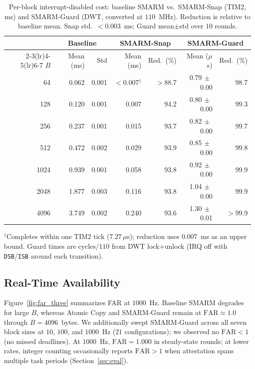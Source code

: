 \documentclass[conference]{IEEEtran}
\newcommand{\smarmcopy}{SMARM-Snap\xspace}
\newcommand{\smarmlock}{SMARM-Guard\xspace}
\begin{document}
\begin{table}[!t]
  \centering
  \small
  \caption{Per-block interrupt-disabled cost: baseline SMARM vs.\
    \smarmcopy{} (TIM2, ms) and \smarmlock{} (DWT, converted at
    $110$~MHz). Reduction is relative to baseline mean.
    Snap std.\ $<0.003$~ms; Guard mean$\pm$std over $10$ rounds.}
  \label{tab:tdisabled}
  \setlength{\tabcolsep}{2.8pt}
  \begin{tabular}{@{}rrrrrrr@{}}
    \toprule
    & \multicolumn{2}{c}{\textbf{Baseline}}
    & \multicolumn{2}{c}{\textbf{\smarmcopy}}
    & \multicolumn{2}{c}{\textbf{\smarmlock}} \\
    \cmidrule(lr){2-3}\cmidrule(lr){4-5}\cmidrule(lr){6-7}
    \textbf{$B$}
      & Mean (ms) & Std
      & Mean (ms) & Red.\ (\%)
      & Mean ($\mu$s) & Red.\ (\%) \\
    \midrule
    64   & 0.062 & 0.001 & $<$0.007$^\dagger$ & $>$88.7
         & 0.79$\,\pm\,$0.00 & 98.7 \\
    128  & 0.120 & 0.001 & 0.007 & 94.2
         & 0.80$\,\pm\,$0.00 & 99.3 \\
    256  & 0.237 & 0.001 & 0.015 & 93.7
         & 0.82$\,\pm\,$0.00 & 99.7 \\
    512  & 0.472 & 0.002 & 0.029 & 93.9
         & 0.85$\,\pm\,$0.00 & 99.8 \\
    1024 & 0.939 & 0.001 & 0.058 & 93.8
         & 0.92$\,\pm\,$0.00 & 99.9 \\
    2048 & 1.877 & 0.003 & 0.116 & 93.8
         & 1.04$\,\pm\,$0.00 & 99.9 \\
    4096 & 3.749 & 0.002 & 0.240 & 93.6
         & 1.30$\,\pm\,$0.01 & $>$99.9 \\
    \bottomrule
  \end{tabular}

  \smallskip
  \raggedright\footnotesize
  $^\dagger$Completes within one TIM2 tick ($7.27\,\mu$s);
  reduction uses $0.007$~ms as an upper bound.
  Guard times are $\mathrm{cycles}/110$ from DWT lock+unlock
  (IRQ off with \texttt{DSB}/\texttt{ISB} around each transition).
\end{table}

\subsection{Real-Time Availability}

Figure~\ref{fig:far_three} summarizes FAR at $1000$~Hz. Baseline SMARM
degrades for large $B$, whereas Atomic Copy and \smarmlock{}
remain at $\mathrm{FAR}\approx 1.0$ through
$B{=}4096$~bytes.
We additionally swept \smarmlock{} across all seven block sizes at
$10$, $100$, and $1000$~Hz ($21$ configurations); we observed no
$\mathrm{FAR}<1$ (no missed deadlines).
At $1000$~Hz, $\mathrm{FAR}=1.000$ in steady-state rounds; at lower
rates, integer counting occasionally reports $\mathrm{FAR}>1$ when
attestation spans multiple task periods (Section~\ref{sec:eval}).
\end{document}

